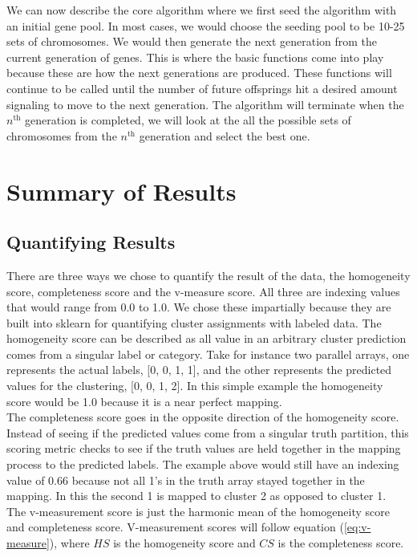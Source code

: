 \documentclass[a4paper,12pt]{article}
\numberwithin{equation}{section}
\begin{document}
We can now describe the core algorithm where we first seed the algorithm with an initial gene pool. In most cases, we would choose the seeding pool to be 10-25 sets of chromosomes. We would then generate the next generation from the current generation of genes. This is where the basic functions come into play because these are how the next generations are produced. These functions will continue to be called until the number of future offsprings hit a desired amount signaling to move to the next generation. The algorithm will terminate when the $n^{\text{th}}$ generation is completed, we will look at the all the possible sets of chromosomes from the $n^{\text{th}}$  generation and select the best one.   
\section{Summary of Results} \label{sec:results}
\subsection{Quantifying Results}

There are three ways we chose to quantify the result of the data, the homogeneity score,  completeness score and the v-measure score. All three are indexing values that would range from 0.0 to 1.0. We chose these impartially because they are built into sklearn for quantifying cluster assignments with labeled data. The homogeneity score can be described as all value in an arbitrary cluster prediction comes from a singular label or category. Take for instance two parallel arrays,  one represents the actual labels, [0, 0, 1, 1], and the other represents the predicted values for the clustering,  [0, 0, 1, 2]. In this simple example the homogeneity score would be 1.0 because it is a near perfect mapping. \\

The completeness score goes in the opposite direction of the homogeneity score. Instead of seeing if the predicted values come from a singular truth partition, this scoring metric checks to see if the truth values are held together in the mapping process to the predicted labels. The example above would still have an indexing value of 0.66 because not all 1's in the truth array stayed together in the mapping. In this the second 1 is mapped to cluster 2 as opposed to cluster 1.  \\

The v-measurement score is just the harmonic mean of the homogeneity score and completeness score.  V-measurement scores will follow equation  (\ref{eq:v-measure}), where $HS$ is the homogeneity score and $CS$ is the completeness score.
\end{document}

